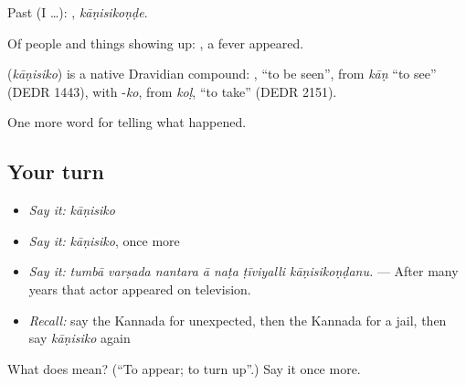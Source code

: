 Past (I …): , \emph{kāṇisikoṇḍe}.

Of people and things showing up:  , a fever appeared.

\begin{cousinweb}
\textbf{} (\emph{kāṇisiko}) is a native Dravidian compound: , \textquotedblleft{}to be seen\textquotedblright{}, from \emph{kāṇ} \textquotedblleft{}to see\textquotedblright{} (DEDR 1443), with -\emph{ko}, from \emph{koḷ}, \textquotedblleft{}to take\textquotedblright{} (DEDR 2151).
\end{cousinweb}

\begin{grammarlens}[title={What you've built}]
One more word for telling what happened.
\end{grammarlens}

\subsection*{Your turn}
\begin{itemize}
\raggedright
  \item \emph{Say it:} \emph{kāṇisiko}
  \item \emph{Say it:} \emph{kāṇisiko}, once more
  \item \emph{Say it:} \emph{tumbā varṣada nantara ā naṭa ṭīviyalli kāṇisikoṇḍanu.} — After many years that actor appeared on television.
  \item \emph{Recall:} say the Kannada for unexpected, then the Kannada for a jail, then say \emph{kāṇisiko} again
\end{itemize}

\begin{tcolorbox}[breakable,colback=teal!4,colframe=teal!35!black,title={Before you move on}]
What does  mean? (\textquotedblleft{}To appear; to turn up\textquotedblright{}.) Say it once more.
\end{tcolorbox}
